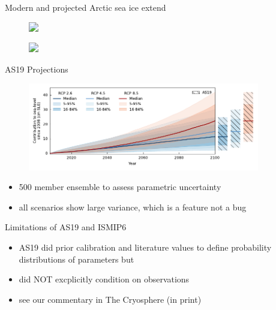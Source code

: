 \documentclass[hide notes,intlimits]{beamer}
\begin{document}
\begin{frame}{Modern and projected Arctic sea ice extend}
  \vspace{-1em}
  \begin{minipage}[t][1.25cm][t]{\textwidth}
    \begin{figure}
      \includegraphics<1->[width=1cm]{brain_solution}
    \end{figure}
  \end{minipage}
  \vspace{0.25em}
  \begin{minipage}[t][6.75cm][b]{\textwidth}
    \begin{figure}
      \includegraphics<2>[height=5.5cm]{grl23061-fig-0001}
    \end{figure}
  \end{minipage}
\end{frame}



\begin{frame}{AS19 Projections}
  \begin{figure}
    \includegraphics[width=0.9\textwidth]{projection_as19_bars}
  \end{figure}
\begin{itemize}
\item 500 member ensemble to assess parametric uncertainty
\item all scenarios show large variance, which is a feature not a bug
\end{itemize}
\note[item]{}
\end{frame}


\begin{frame}{Limitations of AS19 and ISMIP6}
  \begin{figure}
  \end{figure}
\begin{itemize}
\item AS19 did prior calibration and literature values to define probability distributions of parameters \alert{but}
\item did \alert{NOT} excplicitly condition on observations
\item see our commentary in \alert{The Cryosphere (in print)}
\end{itemize}
\note[item]{}
\end{frame}
\end{document}
